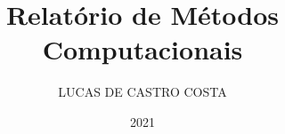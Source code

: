\documentclass[G]{cpgf}
\begin{document}
\title{Relatório de Métodos Computacionais}
\author{LUCAS DE CASTRO COSTA} %
\date{2021}







\capa %

% 



% 


\tableofcontents        





%


% 


 


%

%
\end{document}
